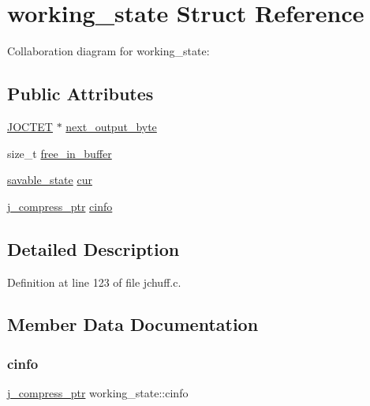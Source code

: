 \hypertarget{structworking__state}{}\section{working\+\_\+state Struct Reference}
\label{structworking__state}


Collaboration diagram for working\+\_\+state\+:
\subsection*{Public Attributes}
\begin{DoxyCompactItemize}
\item 
\mbox{\hyperlink{jmorecfg_8h_a356ad249f20e691b520da439f92cccbc}{J\+O\+C\+T\+ET}} $\ast$ \mbox{\hyperlink{structworking__state_aa672d560261c7d8bb78f4014489f9661}{next\+\_\+output\+\_\+byte}}
\item 
size\+\_\+t \mbox{\hyperlink{structworking__state_a2a369c125a91f2aaebbb71ab52e37e7e}{free\+\_\+in\+\_\+buffer}}
\item 
\mbox{\hyperlink{structsavable__state}{savable\+\_\+state}} \mbox{\hyperlink{structworking__state_a9a55a26239810c0d5ec42c165ee74101}{cur}}
\item 
\mbox{\hyperlink{jpeglib_8h_add2a072c54e3a51550f4975f7ddb91e7}{j\+\_\+compress\+\_\+ptr}} \mbox{\hyperlink{structworking__state_ae54d796ba9c39bb85a922db336e3157b}{cinfo}}
\end{DoxyCompactItemize}


\subsection{Detailed Description}


Definition at line 123 of file jchuff.\+c.



\subsection{Member Data Documentation}
\mbox{\label{structworking__state_ae54d796ba9c39bb85a922db336e3157b}} 
\subsubsection{\texorpdfstring{cinfo}{cinfo}}
{\footnotesize\ttfamily \mbox{\hyperlink{jpeglib_8h_add2a072c54e3a51550f4975f7ddb91e7}{j\+\_\+compress\+\_\+ptr}} working\+\_\+state\+::cinfo}



